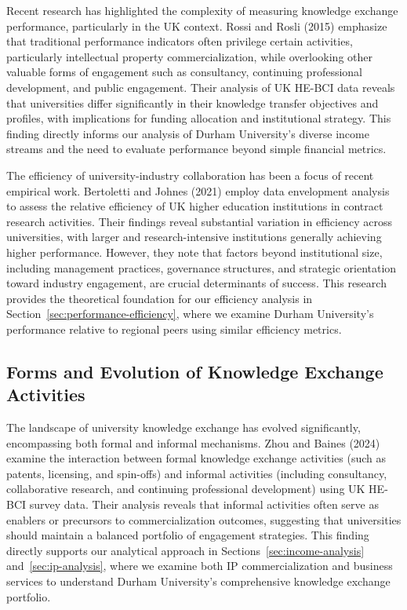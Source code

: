 \documentclass[journal,onecolumn, 10pt,draftclsnofoot]{IEEEtran}
\begin{document}
Recent research has highlighted the complexity of measuring knowledge exchange performance, particularly in the UK context. Rossi and Rosli (2015) \cite{rossi2015indicators} emphasize that traditional performance indicators often privilege certain activities, particularly intellectual property commercialization, while overlooking other valuable forms of engagement such as consultancy, continuing professional development, and public engagement. Their analysis of UK HE-BCI data reveals that universities differ significantly in their knowledge transfer objectives and profiles, with implications for funding allocation and institutional strategy. This finding directly informs our analysis of Durham University's diverse income streams and the need to evaluate performance beyond simple financial metrics.

The efficiency of university-industry collaboration has been a focus of recent empirical work. Bertoletti and Johnes (2021) \cite{bertoletti2021efficiency} employ data envelopment analysis to assess the relative efficiency of UK higher education institutions in contract research activities. Their findings reveal substantial variation in efficiency across universities, with larger and research-intensive institutions generally achieving higher performance. However, they note that factors beyond institutional size, including management practices, governance structures, and strategic orientation toward industry engagement, are crucial determinants of success. This research provides the theoretical foundation for our efficiency analysis in Section~\ref{sec:performance-efficiency}, where we examine Durham University's performance relative to regional peers using similar efficiency metrics.

\subsection{Forms and Evolution of Knowledge Exchange Activities}

The landscape of university knowledge exchange has evolved significantly, encompassing both formal and informal mechanisms. Zhou and Baines (2024) \cite{zhou2024extent} examine the interaction between formal knowledge exchange activities (such as patents, licensing, and spin-offs) and informal activities (including consultancy, collaborative research, and continuing professional development) using UK HE-BCI survey data. Their analysis reveals that informal activities often serve as enablers or precursors to commercialization outcomes, suggesting that universities should maintain a balanced portfolio of engagement strategies. This finding directly supports our analytical approach in Sections~\ref{sec:income-analysis} and~\ref{sec:ip-analysis}, where we examine both IP commercialization and business services to understand Durham University's comprehensive knowledge exchange portfolio.
\end{document}
